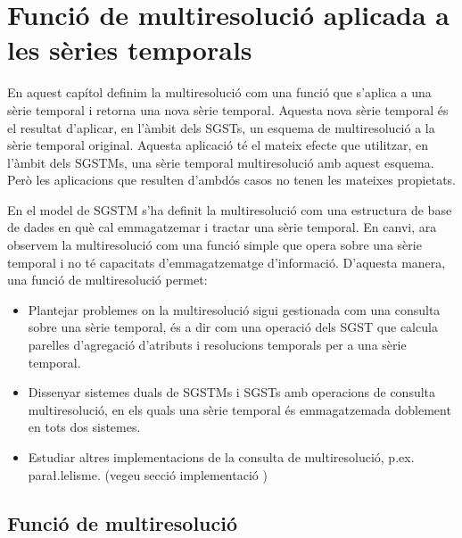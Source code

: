 
\chapter{Funció de multiresolució aplicada a les sèries temporals}


En aquest capítol definim la multiresolució com una funció que
s'aplica a una sèrie temporal i retorna una nova sèrie temporal.
Aquesta nova sèrie temporal és el resultat d'aplicar, en l'àmbit dels
\glspl{SGST}, un esquema de multiresolució a la sèrie temporal
original. Aquesta aplicació té el mateix efecte que utilitzar, en
l'àmbit dels \glspl{SGSTM}, una sèrie temporal multiresolució amb
aquest esquema. Però les aplicacions que resulten d'ambdós casos no
tenen les mateixes propietats.

En el model de \gls{SGSTM} s'ha definit la
multiresolució com una estructura de base de dades en què cal
emmagatzemar i tractar una sèrie temporal. En canvi, ara observem la
multiresolució com una funció simple que opera sobre una sèrie
temporal i no té capacitats d'emmagatzematge d'informació.  D'aquesta
manera, una funció de multiresolució permet:
\begin{itemize}

\item Plantejar problemes on la multiresolució sigui gestionada com
  una consulta sobre una sèrie temporal, és a dir com una operació
  dels \gls{SGST} que calcula parelles d'agregació d'atributs i
  resolucions temporals per a una sèrie temporal.

\item Dissenyar sistemes duals de \glspl{SGSTM} i \glspl{SGST} amb
  operacions de consulta multiresolució, en els quals una sèrie
  temporal és emmagatzemada doblement en tots dos sistemes.

\item Estudiar altres implementacions de la consulta de multiresolució, p.ex. para\l.lelisme. (vegeu secció implementació \todo{})



\end{itemize}





\section{Funció de multiresolució}
\label{sec:multiresolucio:funcio}





